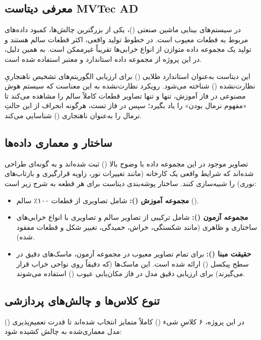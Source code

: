 \documentclass{article}
\begin{document}
\subsection*{معرفی دیتاست MVTec AD}
در سیستم‌های بینایی ماشین صنعتی ()، یکی از بزرگترین چالش‌ها، کمبود داده‌های مربوط به قطعات معیوب است. در خطوط تولید واقعی، اکثر قطعات سالم هستند و تولید یک مجموعه داده متوازن از انواع خرابی‌ها تقریباً غیرممکن است. به همین دلیل، در این پروژه از مجموعه داده استاندارد و معتبر  استفاده شده است.

این دیتاست به‌عنوان استاندارد طلایی () برای ارزیابی الگوریتم‌های تشخیص ناهنجاریِ نظارت‌نشده () شناخته می‌شود. رویکرد نظارت‌نشده به این معناست که سیستم هوش مصنوعی در فاز آموزش، تنها و تنها تصاویر قطعات کاملاً سالم را مشاهده می‌کند تا «مفهوم نرمال بودن» را یاد بگیرد؛ سپس در فاز تست، هرگونه انحراف از این حالتِ نرمال را به‌عنوان ناهنجاری () شناسایی می‌کند.

\subsection*{ساختار و معماری داده‌ها}
تصاویر موجود در این مجموعه داده با وضوح بالا () ثبت شده‌اند و به گونه‌ای طراحی شده‌اند که شرایط واقعی یک کارخانه (مانند تغییرات نور، زاویه قرارگیری و بازتاب‌های نوری) را شبیه‌سازی کنند. ساختار پوشه‌بندی دیتاست برای هر قطعه به شرح زیر است:

\begin{itemize}
	\item \textbf{مجموعه آموزش ():} شامل تصاویری از قطعات ۱۰۰٪ سالم ().
	\item \textbf{مجموعه آزمون ():} شامل ترکیبی از تصاویر سالم و تصاویری با انواع خرابی‌های ساختاری و ظاهری (مانند شکستگی، خراش، خمیدگی، تغییر شکل و قطعات مفقود شده).
	\item \textbf{حقیقت مبنا ():} برای تمام تصاویر معیوب در مجموعه آزمون، ماسک‌های دقیق در سطح پیکسل () ارائه شده است. این ماسک‌ها (که دقیقاً روی نواحی خراب قرار می‌گیرند) برای ارزیابی دقیق مدل در فاز مکان‌یابی عیوب () استفاده می‌شوند.
\end{itemize}

\subsection*{تنوع کلاس‌ها و چالش‌های پردازشی}
در این پروژه، ۶ کلاسِ شیء () کاملاً متمایز انتخاب شده‌اند تا قدرت تعمیم‌پذیری () مدل معماری‌شده به چالش کشیده شود:
\end{document}
